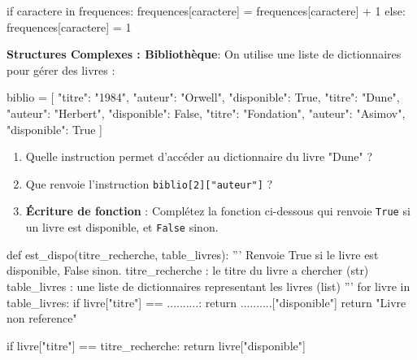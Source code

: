 \documentclass[11pt, a4paper]{report}
\def\ptsexoD{2}
\begin{document}
\begin{blocvisible}[height=3.2]
            {\quad }
          \begin{CodePythontexAlt}[TaillePolice=\large, Largeur=1\linewidth,Centre,Lignes=true,PremLigne=1]{}
    if caractere in frequences:
        frequences[caractere] = frequences[caractere] + 1
    else:
        frequences[caractere] = 1
    \end{CodePythontexAlt}
        \end{blocvisible}

\exods{\ptsexoD} 

\textbf{Structures Complexes : Bibliothèque}: On utilise une liste de dictionnaires pour gérer des livres :
\begin{CodePythontexAlt}[TaillePolice=\large, Largeur=1\linewidth,Centre,Lignes=true,PremLigne=1]{}
biblio = [
    {"titre": "1984", "auteur": "Orwell", "disponible": True},
    {"titre": "Dune", "auteur": "Herbert", "disponible": False},
    {"titre": "Fondation", "auteur": "Asimov", "disponible": True}  ]
\end{CodePythontexAlt}

\begin{enumerate}
    \item Quelle instruction permet d'accéder au dictionnaire du livre "Dune" ? \hfill {}
    \item Que renvoie l'instruction \texttt{biblio[2]["auteur"]} ? \hfill {}
    \item \textbf{Écriture de fonction} : Complétez la fonction ci-dessous qui renvoie \texttt{True} si un livre est disponible, et \texttt{False} sinon.
\end{enumerate}

\begin{CodePythontexAlt}[TaillePolice=\large, Largeur=1\linewidth,Centre,Lignes=true,PremLigne=1]{}
def est_dispo(titre_recherche, table_livres):
    ''' Renvoie True si le livre est disponible, False sinon.
    titre_recherche : le titre du livre a chercher (str)
    table_livres : une liste de dictionnaires representant les livres (list)
    '''
    for livre in table_livres:
        if livre["titre"] == ..........:
            return ..........["disponible"]
    return "Livre non reference"
\end{CodePythontexAlt}

\begin{blocvisible}[height=2.4]
            {\quad }
          \begin{CodePythontexAlt}[TaillePolice=\large, Largeur=1\linewidth,Centre,Lignes=true,PremLigne=1]{}
        if livre["titre"] == titre_recherche:
            return livre["disponible"]
    \end{CodePythontexAlt}
        \end{blocvisible}
\pagebreak
\end{document}
